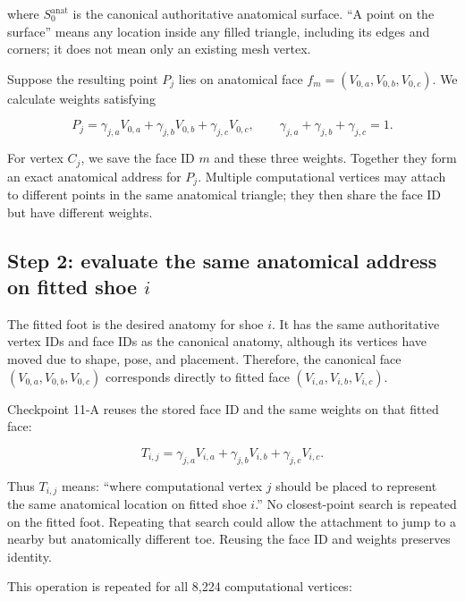 \documentclass[11pt]{article}
\begin{document}
where $S_0^{\mathrm{anat}}$ is the canonical authoritative anatomical surface. ``A point
on the surface'' means any location inside any filled triangle, including its edges and
corners; it does not mean only an existing mesh vertex.

Suppose the resulting point $P_j$ lies on anatomical face
$f_m=(V_{0,a},V_{0,b},V_{0,c})$. We calculate weights satisfying

\begin{equation}
  P_j=\gamma_{j,a}V_{0,a}
      +\gamma_{j,b}V_{0,b}
      +\gamma_{j,c}V_{0,c},
  \qquad
  \gamma_{j,a}+\gamma_{j,b}+\gamma_{j,c}=1.
  \label{eq:11a-reference-attachment}
\end{equation}

For vertex $C_j$, we save the face ID $m$ and these three weights. Together they form an
exact anatomical address for $P_j$. Multiple computational vertices may attach to
different points in the same anatomical triangle; they then share the face ID but have
different weights.

\subsection{Step 2: evaluate the same anatomical address on fitted shoe $i$}

The fitted foot is the desired anatomy for shoe $i$. It has the same authoritative
vertex IDs and face IDs as the canonical anatomy, although its vertices have moved due
to shape, pose, and placement. Therefore, the canonical face
$(V_{0,a},V_{0,b},V_{0,c})$ corresponds directly to fitted face
$(V_{i,a},V_{i,b},V_{i,c})$.

Checkpoint 11-A reuses the stored face ID and the same weights on that fitted face:

\begin{equation}
  T_{i,j}=\gamma_{j,a}V_{i,a}
          +\gamma_{j,b}V_{i,b}
          +\gamma_{j,c}V_{i,c}.
  \label{eq:11a-target}
\end{equation}

Thus $T_{i,j}$ means: ``where computational vertex $j$ should be placed to represent
the same anatomical location on fitted shoe $i$.'' No closest-point search is repeated
on the fitted foot. Repeating that search could allow the attachment to jump to a nearby
but anatomically different toe. Reusing the face ID and weights preserves identity.

This operation is repeated for all 8,224 computational vertices:
\end{document}

